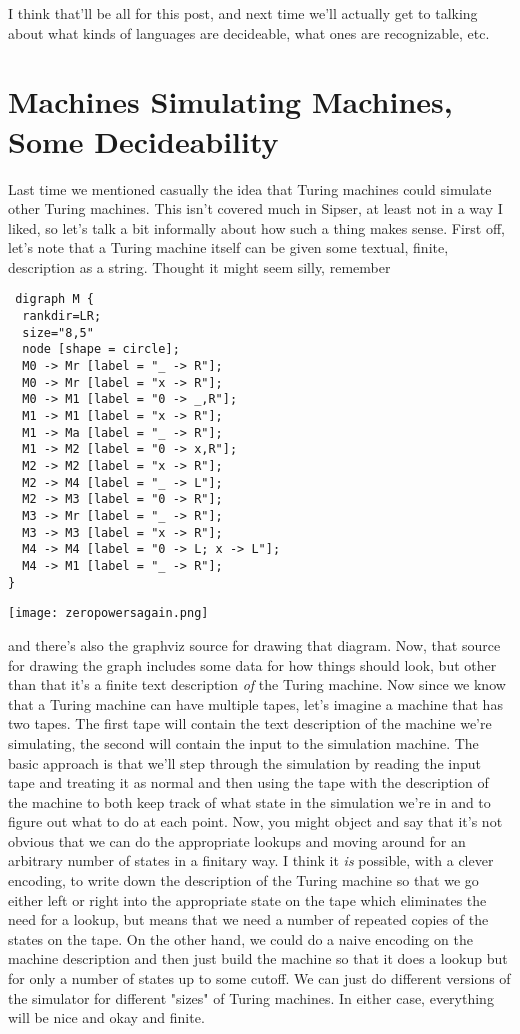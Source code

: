 \documentclass[11pt]{article}
\begin{document}
I think that'll be all for this post, and next time we'll actually get to talking about what kinds of languages are decideable, what ones are recognizable, etc.

\section{Machines Simulating Machines, Some Decideability}
\label{sec-13}
Last time we mentioned casually the idea that Turing machines could simulate other Turing machines. This isn't covered much in Sipser, at least not in a way I liked, so let's talk a bit informally about how such a thing makes sense. First off, let's note that a Turing machine itself can be given some textual, finite, description as a string. Thought it might seem silly, remember 

\begin{verbatim}
 digraph M {
  rankdir=LR;
  size="8,5"
  node [shape = circle];
  M0 -> Mr [label = "_ -> R"];
  M0 -> Mr [label = "x -> R"];
  M0 -> M1 [label = "0 -> _,R"];
  M1 -> M1 [label = "x -> R"];
  M1 -> Ma [label = "_ -> R"];
  M1 -> M2 [label = "0 -> x,R"];
  M2 -> M2 [label = "x -> R"];
  M2 -> M4 [label = "_ -> L"];
  M2 -> M3 [label = "0 -> R"];
  M3 -> Mr [label = "_ -> R"];
  M3 -> M3 [label = "x -> R"];
  M4 -> M4 [label = "0 -> L; x -> L"];
  M4 -> M1 [label = "_ -> R"];
}
\end{verbatim}

\texttt{[image: zeropowersagain.png]}

and there's also the graphviz source for drawing that diagram. Now, that source for drawing the graph includes some data for how things should look, but other than that it's a finite text description \emph{of} the Turing machine. Now since we know that a Turing machine can have multiple tapes, let's imagine a machine that has two tapes. The first tape will contain the text description of the machine we're simulating, the second will contain the input to the simulation machine. The basic approach is that we'll step through the simulation by reading the input tape and treating it as normal and then using the tape with the description of the machine to both keep track of what state in the simulation we're in and to figure out what to do at each point. Now, you might object and say that it's not obvious that we can do the appropriate lookups and moving around for an arbitrary number of states in a finitary way. I think it \emph{is} possible, with a clever encoding, to write down the description of the Turing machine so that we go either left or right into the appropriate state on the tape which eliminates the need for a lookup, but means that we need a number of repeated copies of the states on the tape. On the other hand, we could do a naive encoding on the machine description and then just build the machine so that it does a lookup but for only a number of states up to some cutoff. We can just do different versions of the simulator for different "sizes" of Turing machines. In either case, everything will be nice and okay and finite.
\end{document}
